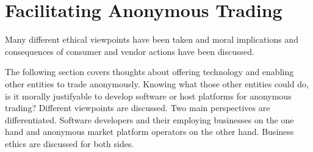 \section{Facilitating Anonymous Trading}


Many different ethical viewpoints have been taken and moral implications and consequences of consumer and vendor actions have been discussed.

The following section covers thoughts about offering technology and enabling other entities to trade anonymously. Knowing what those other entities could do, is it morally justifyable to develop software or host platforms for anonymous trading? Different viewpoints are discussed. Two main perspectives are differentiated. Software developers and their employing businesses on the one hand and anonymous market platform operators on the other hand. Business ethics are discussed for both sides. 






